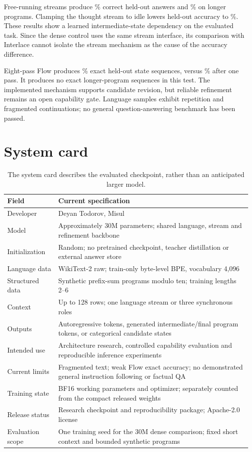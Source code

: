 \documentclass[11pt]{article}
\begin{document}
Free-running streams produce \MisulFPStreamHeld\% correct held-out answers
and \MisulFPStreamLong\% on longer programs. Clamping the thought stream to
idle lowers held-out accuracy to \MisulFPIdleThought\%. These results show a
learned intermediate-state dependency on the evaluated task. Since the dense
control uses the same stream interface, its comparison with Interlace cannot
isolate the stream mechanism as the cause of the accuracy difference.

Eight-pass Flow produces \MisulFPFlowEight\% exact held-out state sequences,
versus \MisulFPFlowOne\% after one pass. It produces no exact longer-program
sequences in this test. The implemented mechanism supports candidate revision,
but reliable refinement remains an open capability gate. Language samples
exhibit repetition and fragmented continuations; no general question-answering
benchmark has been passed.

\section{System card}
\begin{table}[H]
\centering
\small
\begin{tabularx}{\textwidth}{@{}p{}X@{}}
\toprule
Field & Current specification\\
\midrule
Developer & Deyan Todorov, Misul\\
Model & Approximately 30M parameters; shared language, stream and refinement backbone\\
Initialization & Random; no pretrained checkpoint, teacher distillation or external answer store\\
Language data & WikiText-2 raw; train-only byte-level BPE, vocabulary 4,096\\
Structured data & Synthetic prefix-sum programs modulo ten; training lengths 2--6\\
Context & Up to 128 rows; one language stream or three synchronous roles\\
Outputs & Autoregressive tokens, generated intermediate/final program tokens, or categorical candidate states\\
Intended use & Architecture research, controlled capability evaluation and reproducible inference experiments\\
Current limits & Fragmented text; weak Flow exact accuracy; no demonstrated general instruction following or factual QA\\
Training state & BF16 working parameters and optimizer; separately counted from the compact released weights\\
Release status & Research checkpoint and reproducibility package; Apache-2.0 license\\
Evaluation scope & One training seed for the 30M dense comparison; fixed short context and bounded synthetic programs\\
\bottomrule
\end{tabularx}
\caption{The system card describes the evaluated checkpoint, rather than an
anticipated larger model.}
\end{table}
\end{document}
